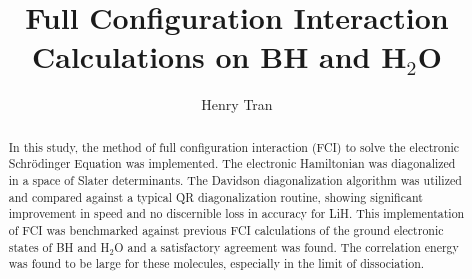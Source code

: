 \documentclass[final,3p,times,twocolumn]{elsarticle}
\begin{document}
\begin{frontmatter}



\title{Full Configuration Interaction Calculations on BH and H$_2$O}


\author{Henry Tran}

\address{Department of Chemistry, Lensfield Road, Cambridge, UK,
CB2 1EW}

\begin{abstract}
In this study, the method of full configuration interaction (FCI) to solve the electronic Schr\"{o}dinger Equation was implemented. The electronic Hamiltonian was diagonalized in a space of Slater determinants. The Davidson diagonalization algorithm was utilized and compared against a typical QR diagonalization routine, showing significant improvement in speed and no discernible loss in accuracy for LiH. This implementation of FCI was benchmarked against previous FCI calculations of the ground electronic states of BH and H$_2$O and a satisfactory agreement was found. The correlation energy was found to be large for these molecules, especially in the limit of dissociation.
\end{abstract}

\end{frontmatter}


\end{document}

